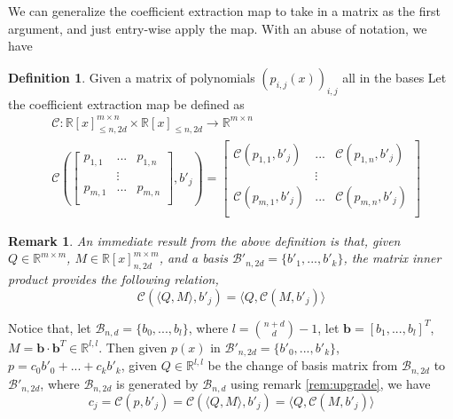 \documentclass[12pt]{amsart}
\numberwithin{equation}{section}
\newtheorem{remark}[thm]{Remark}
\theoremstyle{definition}
\newtheorem{definition}[thm]{Definition}
\numberwithin{thm}{section}
\begin{document}
\smallskip 
We can generalize the {coefficient extraction map} to take in a matrix as the first argument, and just entry-wise apply the map. With an abuse of notation, we have 
\begin{definition}
     Given a matrix of polynomials $(p_{i, j}(x))_{i, j}$ all in the bases Let the {coefficient extraction map} be defined as 
     \begin{equation*}
          \begin{split}
               & \mathcal{C}: \mathbb{R}[x]_{\leq n, 2d}^{m \times n} \times \mathbb{R}[x]_{\leq n, 2d} \rightarrow \mathbb{R}^{m \times n} \\
               & \mathcal{C}(
                    \begin{bmatrix} 
                         p_{1, 1} & ... & p_{1, n} \\
                         & \vdots \\
                         p_{m, 1} & ... & p_{m, n} \\
                    \end{bmatrix}, b'_j
               ) = \begin{bmatrix} 
                    \mathcal{C}(p_{1, 1}, b'_j) & ... &  \mathcal{C}(p_{1, n}, b'_j) \\
                    & \vdots \\
                    \mathcal{C}(p_{m, 1}, b'_j) & ... &  \mathcal{C}(p_{m, n}, b'_j) \\
                    \end{bmatrix}
          \end{split}
     \end{equation*}
\end{definition}

\begin{remark}
     An immediate result from the above definition is that, given $Q \in \mathbb{R}^{m \times m}$, $M \in \mathbb{R}[x]_{n, 2d}^{m \times m}$, 
     and a basis $\mathcal{B}'_{n, 2d} = \{b'_1, ..., b'_k\}$, the matrix inner product provides the following relation,
     \begin{equation*}
          \mathcal{C}(\langle Q, M \rangle, b'_j) = \langle Q, \mathcal{C}(M, b'_j) \rangle
     \end{equation*}
\end{remark}

\smallskip
Notice that, let $\mathcal{B}_{n, d} = \{b_0,...,b_l\}$, where $l = {n + d \choose d} - 1$, 
let $\mathbf{b} = [b_1, ..., b_l]^T$, $M = \mathbf{b} \cdot \mathbf{b}^T \in \mathbb{R}^{l, l}$. 
Then given $p(x)$ in $\mathcal{B}'_{n, 2d} = \{b'_0, ..., b'_k\}$, $p = c_0b'_0 + ... + c_k b'_k$, 
given $Q \in \mathbb{R}^{l, l}$ be the change of basis matrix from $\mathcal{B}_{n, 2d}$ to $\mathcal{B}'_{n, 2d}$, 
where $\mathcal{B}_{n, 2d}$ is generated by $\mathcal{B}_{n, d}$ using remark \ref{rem:upgrade}, we have
\begin{equation}
     c_j = \mathcal{C}(p, b'_j) = \mathcal{C}(\langle Q, M \rangle, b'_j ) = \langle Q, \mathcal{C}(M, b'_j) \rangle
\end{equation}
\end{document}
